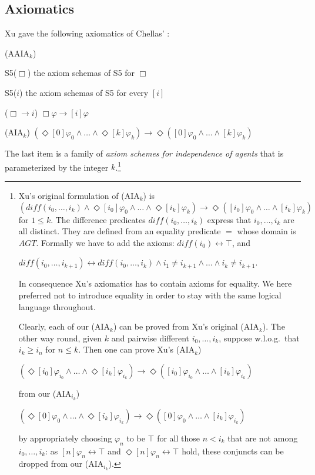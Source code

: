 \documentclass{article}
\renewcommand{\phi}{\varphi}
\newcommand{\eqv}{\leftrightarrow}      \newcommand{\imp}{\rightarrow}          \newcommand{\subfml}{\mathit{sf}}
\newcommand{\cstit}[1]{[{#1}]}           \newcommand{\poscstit}[1]{\langle {#1} \rangle}    \newcommand{\dstit}[2]{[{#1}\ \mathit{dstit}\! :{#2}]}
\newcommand{\InclBox}[1]{$\Box \!\! \imp \!\! #1$}
\newcommand{\agtset}{\ensuremath{\mathit{AGT}}}
\begin{document}
\goodbreak
\subsection{Axiomatics}
Xu gave the following axiomatics of Chellas' \CSTIT:
\begin{itemlist}{(AAIA$_k$)}
  \item[S5($\Box$)]     the axiom schemas of S5  for $\Box$
  \item[S5($i$)]        the axiom schemas of S5 for every $\cstit{i}$
  \item[(\InclBox{i})] $\Box \phi \imp \cstit{i} \phi  $
  \item[(AIA$_k$)]
  $(\Diamond \cstit{0} \phi_0 \land \ldots \land
    \Diamond \cstit{k} \phi_k                    ) \imp
    \Diamond (\cstit{0} \phi_0 \land \ldots \land
              \cstit{k} \phi_k                   )  $
\end{itemlist}
The last item is a family of \emph{axiom schemes for
independence of agents} that is parameterized by the integer $k$.\footnote{
Xu's original formulation of (AIA$_k$) is
$$
(\mathit{diff}(i_0,\ldots,i_k) \land
    \Diamond \cstit{i_0} \phi_0 \land \ldots \land
    \Diamond \cstit{i_k} \phi_k                    ) \imp
    \Diamond (\cstit{i_0} \phi_0 \land \ldots \land
              \cstit{i_k} \phi_k                   )
$$       for $1 \leq k$.
The difference predicates $\mathit{diff}(i_0,\ldots, i_k)$ express that
$i_0,\ldots, i_k $ are all distinct.
They are defined from an equality predicate $=$ whose domain is $\agtset$.
Formally we have to add the axioms:
$\mathit{diff}(i_0) \eqv \top$, and
\\ \centerline{
$\mathit{diff}(i_0,\ldots,i_{k+1}) \eqv
 \mathit{diff}(i_0,\ldots,i_k)
 \land i_1 \not = i_{k+1} \land \ldots  \land i_k \not = i_{k+1} $.
}
In consequence Xu's axiomatics has to contain axioms for equality.
We here preferred not to introduce equality in order to stay with the same
logical language throughout.

Clearly, each of our (AIA$_k$) can be proved from Xu's original (AIA$_k$).
The other way round, given $k$ and pairwise different $i_0,\ldots,i_k$,
suppose w.l.o.g.\ that $i_k \geq i_n$ for $n \leq k$.
Then one can prove Xu's (AIA$_k$)
\\ \centerline{
  $(\Diamond \cstit{i_0} \phi_{i_0} \land \ldots \land
    \Diamond \cstit{i_k} \phi_{i_k}                    ) \imp
    \Diamond (\cstit{i_0} \phi_{i_0} \land \ldots \land
              \cstit{i_k} \phi_{i_k}                   )   $
}
from our (AIA$_{i_k}$)
\\ \centerline{
  $(\Diamond \cstit{0} \phi_0 \land \ldots \land
    \Diamond \cstit{i_k} \phi_{i_k}                    ) \imp
    \Diamond (\cstit{0} \phi_0 \land \ldots \land
              \cstit{i_k} \phi_{i_k}                   )  $
}
by appropriately choosing $\phi_{n}$ to be $\top$ for all those $n < i_k$
that are not among $i_0,\ldots,i_k$: as $\cstit{n} \phi_n \eqv \top$
and $\Diamond \cstit{n} \phi_n \eqv \top$ hold, these conjuncts can be dropped
from our (AIA$_{i_k}$).

}
\end{document}
